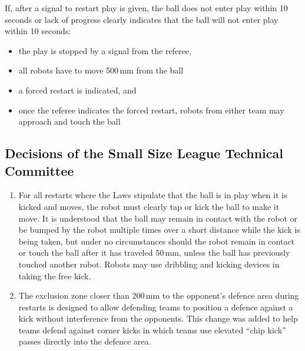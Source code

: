 If, after a signal to restart play is given, the ball does not enter play within 10 seconds or lack of progress clearly indicates that the ball will not enter play within 10 seconds:
\begin{itemize}
\item the play is stopped by a signal from the referee,
\item all robots have to move 500\,mm from the ball
\item a forced restart is indicated, and
\item once the referee indicates the forced restart, robots from either team may approach and touch the ball
\end{itemize}

\subsection*{Decisions of the Small Size League Technical Committee}
\begin{enumerate}
\item
For all restarts where the Laws stipulate that the ball is in play when it is kicked and moves, the robot must clearly tap or kick the ball to make it move.
It is understood that the ball may remain in contact with the robot or be bumped by the robot multiple times over a short distance while the kick is being taken, but under no circumstances should the robot remain in contact or touch the ball after it has traveled 50\,mm, unless the ball has previously touched another robot.
Robots may use dribbling and kicking devices in taking the free kick.

\item
The exclusion zone closer than 200\,mm to the opponent's defence area during restarts is designed to allow defending teams to position a defence against a kick without interference from the opponents.
This change was added to help teams defend against corner kicks in which teams use elevated ``chip kick'' passes directly into the defence area.
\end{enumerate}
